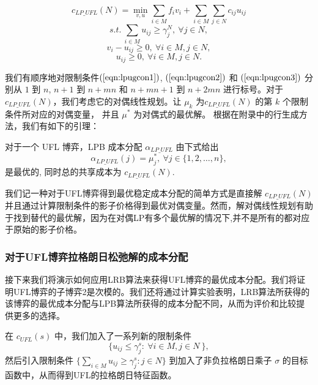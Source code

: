 \documentclass[UTF8]{article}
\begin{document}
\begin{定义}
      \begin{equation*}\label{eqn:lpugobj}
      c_{LP\_UFL}(N) = \min_{v,u} \sum_{i \in M} f_iv_i + \sum_{i \in M} \sum_{j \in N} c_{ij}u_{ij}
      \end{equation*}
      \begin{equation} \label{eqn:lpugcon1}
      s.t.~\sum_{i \in M} u_{ij} \geq \gamma_j^N, ~\forall j \in N,
      \end{equation}
      \begin{equation}\label{eqn:lpugcon2}
      v_i - u_{ij} \geq 0, ~\forall i \in M, j \in N,
      \end{equation}
      \begin{equation}\label{eqn:lpugcon3}
      u_{ij} \geq 0, ~\forall i \in M, j \in N.
      \end{equation}

      我们有顺序地对限制条件$(\ref{eqn:lpugcon1})$, $(\ref{eqn:lpugcon2})$ 和 $(\ref{eqn:lpugcon3})$ 分别从 $1$ 到 $n$, $n+1$ 到 $n+mn$ 和 $n+mn+1$ 到 $n+2mn$ 进行标号。对于 $c_{LP\_UFL}(N)$，我们考虑它的对偶线性规划。让 $\mu_k$ 为$c_{LP\_UFL}(N)$ 的第 $k$ 个限制条件所对应的对偶变量， 并且 $\mu^*$ 为对偶式的最优解。
      根据在附录中的行生成方法，我们有如下的引理：

      \begin{lemma}\label{lemma:lpbcaufl}
      对于一个 UFL 博弈，LPB 成本分配 $\alpha_{LP\_UFL}$ 由下式给出
      \begin{equation*}
      \alpha_{LP\_UFL}(j) = \mu_j^*, ~\forall j \in \big\{1,2,\ldots,n\big\},
      \end{equation*}
      是最优的, 同时总的共享成本为 $c_{LP\_UFL}(N)$.
      \end{lemma}

      我们记一种对于UFL博弈得到最优稳定成本分配的简单方式是直接解 $c_{LP\_UFL}(N)$ 并且通过计算限制条件的影子价格得到最优对偶变量。然而，解对偶线性规划有助于找到替代的最优解，因为在对偶LP有多个最优解的情况下,并不是所有的都对应于原始的影子价格。

      \subsubsection{对于UFL博弈拉格朗日松弛解的成本分配}
      接下来我们将演示如何应用LRB算法来获得UFL博弈的最优成本分配。我们将证明UFL博弈的子博弈2是次模的。我们还将通过计算实验表明，LRB算法所获得的该博弈的最优成本分配与LPB算法所获得的成本分配不同，从而为评价和比较提供更多的选择。

      在 $c_{UFL}(s)$ 中，我们加入了一系列新的限制条件
      \begin{equation}\label{eqn:UFLLRBC}
      \big\{ u_{ij} \leq \gamma_j^s: ~\forall i \in M, j \in N\ \big\},
      \end{equation}
      然后引入限制条件 $\{ \sum_{i \in M} u_{ij} \geq \gamma_j^s:j \in N \}$ 到加入了非负拉格朗日乘子 $\sigma$ 的目标函数中，从而得到UFL的拉格朗日特征函数。


\end{定义}
\end{document}
